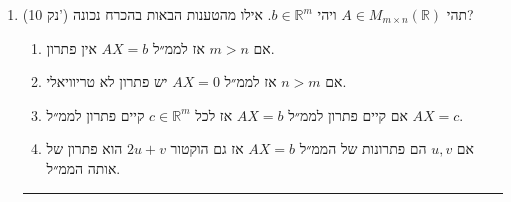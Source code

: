 \documentclass[12pt, a4paper]{article}
\newcommand{\rr}{\mathbb{R}}
\newcommand{\points}[1]{(#1 נק') }
\begin{document}
\begin{enumerate}
\noindent\rule{16cm}{0.4pt}

\underline{פתרון:}
בגלל ש-$H$
מקביל למישור הנתון על ידי המשוואה
$x+2y+z=3$,
משוואתו תהיה נתונה על ידי
$x+2y+z=d$
עבור
$d\in\rr$
כלשהו (למה? אם הם מקבילים אז יש להם אותו נורמל, שהוא
$(1,2,1)$).

עוד נתון כי
$H$
עובר בנקודה
$(2,-1,1)$
ולכן בהכרח יתקיים
$2+2(-1)+1=d$,
אז
$d=1$.
לסיכום, משוואת המישור
$H$
היא
$$x+2y+z=1$$
נציב את הנקודות הנתונות ונגלה כי רק
$(3,-2,2)\in H$,
אז התשובה הנכונה היא
(ב).



\newpage


\item\points{10}
תהי
$A\in M_{m\times n}(\rr)$
ויהי
$b\in \rr^m$.
אילו מהטענות הבאות בהכרח נכונה?
\begin{enumerate}
\item
אם
$m>n$
אז לממ״ל
$AX=b$
אין פתרון.
\item
אם
$n>m$
אז לממ״ל
$AX=0$
יש פתרון לא טריוויאלי.
\item
אם קיים פתרון לממ״ל
$AX=b$
אז לכל
$c\in \rr^m$
קיים פתרון לממ״ל
$AX=c$.
\item
אם
$u,v$
הם פתרונות של הממ״ל
$AX=b$
אז גם הוקטור
$2u+v$
הוא פתרון של אותה הממ״ל.
\end{enumerate}

\noindent\rule{16cm}{0.4pt}


\end{enumerate}
\end{document}
